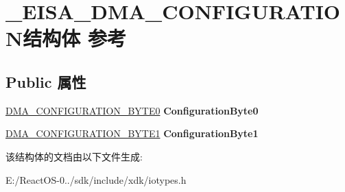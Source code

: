 \hypertarget{struct___e_i_s_a___d_m_a___c_o_n_f_i_g_u_r_a_t_i_o_n}{}\section{\+\_\+\+E\+I\+S\+A\+\_\+\+D\+M\+A\+\_\+\+C\+O\+N\+F\+I\+G\+U\+R\+A\+T\+I\+O\+N结构体 参考}
\label{struct___e_i_s_a___d_m_a___c_o_n_f_i_g_u_r_a_t_i_o_n}
\subsection*{Public 属性}
\begin{DoxyCompactItemize}
\item 
\mbox{\label{struct___e_i_s_a___d_m_a___c_o_n_f_i_g_u_r_a_t_i_o_n_ac72f1d8c3db90c5c600d8e1ce3a2b3e0}} 
\hyperlink{struct___d_m_a___c_o_n_f_i_g_u_r_a_t_i_o_n___b_y_t_e0}{D\+M\+A\+\_\+\+C\+O\+N\+F\+I\+G\+U\+R\+A\+T\+I\+O\+N\+\_\+\+B\+Y\+T\+E0} {\bfseries Configuration\+Byte0}
\item 
\mbox{\label{struct___e_i_s_a___d_m_a___c_o_n_f_i_g_u_r_a_t_i_o_n_a60341d6136eabe511333fffaf6f5b87a}} 
\hyperlink{struct___d_m_a___c_o_n_f_i_g_u_r_a_t_i_o_n___b_y_t_e1}{D\+M\+A\+\_\+\+C\+O\+N\+F\+I\+G\+U\+R\+A\+T\+I\+O\+N\+\_\+\+B\+Y\+T\+E1} {\bfseries Configuration\+Byte1}
\end{DoxyCompactItemize}


该结构体的文档由以下文件生成\+:\begin{DoxyCompactItemize}
\item 
E\+:/\+React\+O\+S-\/0../sdk/include/xdk/iotypes.\+h\end{DoxyCompactItemize}
